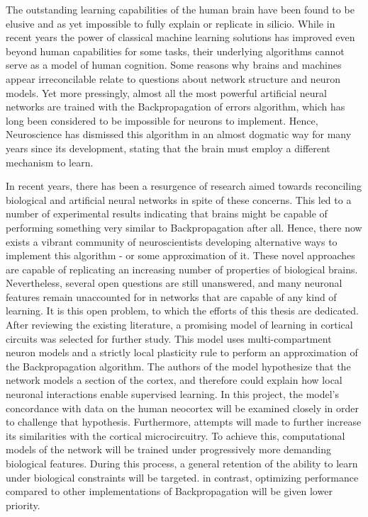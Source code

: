 The outstanding learning capabilities of the human brain have been found to be elusive and as yet impossible to fully
explain or replicate in silicio. While in recent years the power of classical machine learning solutions  has improved
even beyond human capabilities for some tasks, their underlying algorithms cannot serve as a model of human cognition.
Some reasons why brains and machines appear irreconcilable relate to questions about network structure and neuron
models. Yet more pressingly, almost all the most powerful artificial neural networks are trained with the
Backpropagation of errors algorithm, which has long been considered to be impossible for neurons to implement. Hence,
Neuroscience has dismissed this algorithm in an almost dogmatic way for many years since its development, stating that
the brain must employ a different mechanism to learn.

In recent years, there has been a resurgence of research aimed towards reconciling biological and artificial neural
networks in spite of these concerns. This led to a number of experimental results indicating that brains might be
capable of performing something very similar to Backpropagation after all. Hence, there now exists a vibrant community
of neuroscientists developing alternative ways to implement this algorithm - or some approximation of it. These novel
approaches are capable of replicating an increasing number of properties of biological brains. Nevertheless, several
open questions are still unanswered, and many neuronal features remain unaccounted for in networks that are capable of
any kind of learning. It is this open problem, to which the efforts of this thesis are dedicated. After reviewing the
existing literature, a promising model of learning in cortical circuits was selected for further study. This model uses
multi-compartment neuron models and a strictly local plasticity rule to perform an approximation of the Backpropagation
algorithm. The authors of the model hypothesize that the network models a section of the cortex, and therefore could
explain how local neuronal interactions enable supervised learning. In this project, the model's concordance
with data on the human neocortex will be examined closely in order to challenge that hypothesis. Furthermore, attempts
will made to further increase its similarities with the cortical microcircuitry. To achieve this, computational models
of the network will be trained under progressively more demanding biological features. During this process, a general
retention of the ability to learn under biological constraints will be targeted. in contrast, optimizing performance
compared to other implementations of Backpropagation will be given lower priority.


